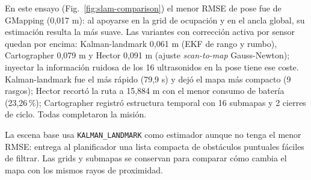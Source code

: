 En este ensayo (Fig.~\ref{fig:slam-comparison}) el menor RMSE de pose fue de
GMapping (0,017 m): al apoyarse en la grid de ocupación y en el ancla global, su
estimación resulta la más suave. Las variantes con corrección activa por sensor
quedan por encima: Kalman-landmark 0,061 m (EKF de rango y rumbo), Cartographer
0,079 m y Hector 0,091 m (ajuste \textit{scan-to-map} Gauss-Newton); inyectar la
información ruidosa de los 16 ultrasonidos en la pose tiene ese coste.
Kalman-landmark fue el más rápido (79,9 s) y dejó el mapa más compacto (9
rasgos); Hector recortó la ruta a 15,884 m con el menor consumo de batería
(23,26\,\%); Cartographer registró estructura temporal con 16 submapas y 2
cierres de ciclo. Todas completaron la misión.

La escena base usa \texttt{KALMAN\_LANDMARK} como estimador aunque no tenga el
menor RMSE: entrega al planificador una lista compacta de obstáculos puntuales
fáciles de filtrar. Las grids y submapas se conservan para comparar cómo cambia
el mapa con los mismos rayos de proximidad.

